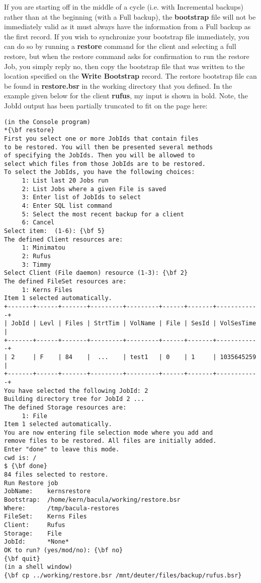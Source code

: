 If you are starting off in the middle of a cycle (i.e. with Incremental
backups) rather than at the beginning (with a Full backup), the {\bf
bootstrap} file will not be immediately valid as it must always have the
information from a Full backup as the first record. If you wish to synchronize
your bootstrap file immediately, you can do so by running a {\bf restore}
command for the client and selecting a full restore, but when the restore
command asks for confirmation to run the restore Job, you simply reply no,
then copy the bootstrap file that was written to the location specified on the
{\bf Write Bootstrap} record. The restore bootstrap file can be found in {\bf
restore.bsr} in the working directory that you defined. In the example given
below for the client {\bf rufus}, my input is shown in bold. Note, the JobId
output has been partially truncated to fit on the page here: 

\footnotesize
\begin{verbatim}
(in the Console program)
*{\bf restore}
First you select one or more JobIds that contain files
to be restored. You will then be presented several methods
of specifying the JobIds. Then you will be allowed to
select which files from those JobIds are to be restored.
To select the JobIds, you have the following choices:
     1: List last 20 Jobs run
     2: List Jobs where a given File is saved
     3: Enter list of JobIds to select
     4: Enter SQL list command
     5: Select the most recent backup for a client
     6: Cancel
Select item:  (1-6): {\bf 5}
The defined Client resources are:
     1: Minimatou
     2: Rufus
     3: Timmy
Select Client (File daemon) resource (1-3): {\bf 2}
The defined FileSet resources are:
     1: Kerns Files
Item 1 selected automatically.
+-------+------+-------+---------+---------+------+-------+------------+
| JobId | Levl | Files | StrtTim | VolName | File | SesId | VolSesTime |
+-------+------+-------+---------+---------+------+-------+------------+
| 2     | F    | 84    |  ...    | test1   | 0    | 1     | 1035645259 |
+-------+------+-------+---------+---------+------+-------+------------+
You have selected the following JobId: 2
Building directory tree for JobId 2 ...
The defined Storage resources are:
     1: File
Item 1 selected automatically.
You are now entering file selection mode where you add and
remove files to be restored. All files are initially added.
Enter "done" to leave this mode.
cwd is: /
$ {\bf done}
84 files selected to restore.
Run Restore job
JobName:    kernsrestore
Bootstrap:  /home/kern/bacula/working/restore.bsr
Where:      /tmp/bacula-restores
FileSet:    Kerns Files
Client:     Rufus
Storage:    File
JobId:      *None*
OK to run? (yes/mod/no): {\bf no}
{\bf quit}
(in a shell window)
{\bf cp ../working/restore.bsr /mnt/deuter/files/backup/rufus.bsr}
\end{verbatim}
\normalsize

